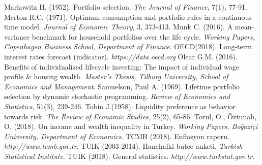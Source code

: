 \begin{thebibliography}{}
 Markowitz H. (1952). Portfolio selection. \textit{The Journal of Finance}, 7(1), 77-91.
 Merton R.C. (1971). Optimum consumption and portfolio rules in a continuous-time model. \textit{Journal of Economic Theory}, 3, 373-413.
 Munk C. (2016). A mean-variance benchmark for household portfolios over the life cycle. \textit{Working Papers, Copenhagen Business School, Department of Finance}.
 OECD(2018). Long-term interest rates forecast (indicator). \textit{https://data.oecd.org}
 Olear G.M. (2016). Benefits of individualized lifecycle investing: The impact of individual wage profile \& housing wealth. \textit{Master's Thesis, Tilburg University, School of Economics and Management}.
 Samuelson, Paul A. (1969). Lifetime portfolio selection by dynamic stochastic programming. \textit{Review of Economics and Statistics}, 51(3), 239-246.
 Tobin J.(1958). Liquidity preference as behavior towards risk. \textit{The Review of Economic Studies}, 25(2), 65-86.
 Torul, O., Öztunalı, O. (2018). On income and wealth inequality in Turkey. \textit{Working Papers, Boğaziçi University, Department of Economics}.
 TCMB (2018). Enflasyon raporu. \textit{http://www.tcmb.gov.tr}.
 TUIK (2003-2014). Hanehalki butce anketi. \textit{Turkish Statistical Institute}.
 TUIK (2018). General statistics. \textit{http://www.turkstat.gov.tr}.
\end{thebibliography}
\endgroup
